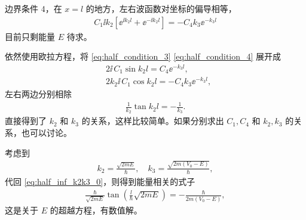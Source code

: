 边界条件 4，在 $x=l$ 的地方，左右波函数对坐标的偏导相等，
\begin{eqnarray}
    C_1 \ii k_2 \left[
        \ee ^{\ii k_2 l} + \ee^{-\ii k_2 l} 
    \right] = - C_4 k_3 \ee^{-k_3 l} \label{eq:half_condition_4}
\end{eqnarray}
目前只剩能量 $E$ 待求。

依然使用欧拉方程，将 \eqref{eq:half_condition_3} \eqref{eq:half_condition_4} 展开成
\begin{align}
    & 2\ii \,C_1 \sin k_2l = C_4 \ee^{-k_3 l}, \\
    & 2 k_2 \ii \, C_1 \cos k_2 l = - C_4 k_3 \ee^{-k_3 l}, 
\end{align}
左右两边分别相除
\begin{eqnarray}
    \frac1{k_2} \tan k_2l = - \frac1{k_3}. 
    \label{eq:half_inf_k2k3_0}
\end{eqnarray}
直接得到了 $k_2$ 和 $k_3$ 的关系，这样比较简单。如果分别求出 $C_1, C_4$ 和 $k_2, k_3$ 的关系，也可以讨论。

考虑到
\begin{eqnarray}
    k_2 = \frac{\sqrt{2mE}}{\hbar}, \quad k_3 = \frac{\sqrt{2m(V_0- E)}}{\hbar}, \label{eq:half_inf_k2k3_def}
\end{eqnarray}
代回 \eqref{eq:half_inf_k2k3_0}，则得到能量相关的式子
\begin{eqnarray}
    \frac{\hbar}{\sqrt{2mE}} \tan \left(
        \frac l{\hbar} \sqrt{2mE}
    \right)
    = - \frac{\hbar}{2m(V_0 - E)},
    \label{eq:half_inf_k2k3_transcendental}
\end{eqnarray}
这是关于 $E$ 的超越方程，有数值解。

